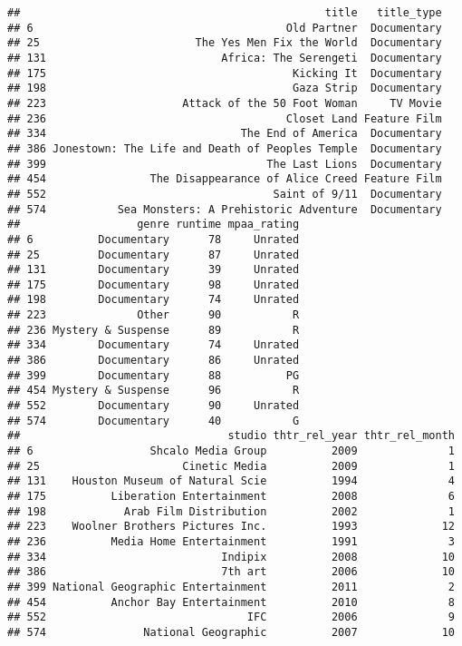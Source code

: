 \documentclass[]{article}
\begin{document}
\begin{verbatim}
##                                               title   title_type
## 6                                       Old Partner  Documentary
## 25                        The Yes Men Fix the World  Documentary
## 131                           Africa: The Serengeti  Documentary
## 175                                      Kicking It  Documentary
## 198                                      Gaza Strip  Documentary
## 223                     Attack of the 50 Foot Woman     TV Movie
## 236                                     Closet Land Feature Film
## 334                              The End of America  Documentary
## 386 Jonestown: The Life and Death of Peoples Temple  Documentary
## 399                                  The Last Lions  Documentary
## 454                The Disappearance of Alice Creed Feature Film
## 552                                   Saint of 9/11  Documentary
## 574           Sea Monsters: A Prehistoric Adventure  Documentary
##                  genre runtime mpaa_rating
## 6          Documentary      78     Unrated
## 25         Documentary      87     Unrated
## 131        Documentary      39     Unrated
## 175        Documentary      98     Unrated
## 198        Documentary      74     Unrated
## 223              Other      90           R
## 236 Mystery & Suspense      89           R
## 334        Documentary      74     Unrated
## 386        Documentary      86     Unrated
## 399        Documentary      88          PG
## 454 Mystery & Suspense      96           R
## 552        Documentary      90     Unrated
## 574        Documentary      40           G
##                                studio thtr_rel_year thtr_rel_month
## 6                  Shcalo Media Group          2009              1
## 25                      Cinetic Media          2009              1
## 131    Houston Museum of Natural Scie          1994              4
## 175          Liberation Entertainment          2008              6
## 198            Arab Film Distribution          2002              1
## 223    Woolner Brothers Pictures Inc.          1993             12
## 236          Media Home Entertainment          1991              3
## 334                           Indipix          2008             10
## 386                           7th art          2006             10
## 399 National Geographic Entertainment          2011              2
## 454          Anchor Bay Entertainment          2010              8
## 552                               IFC          2006              9
## 574               National Geographic          2007             10

\end{verbatim}
\end{document}
